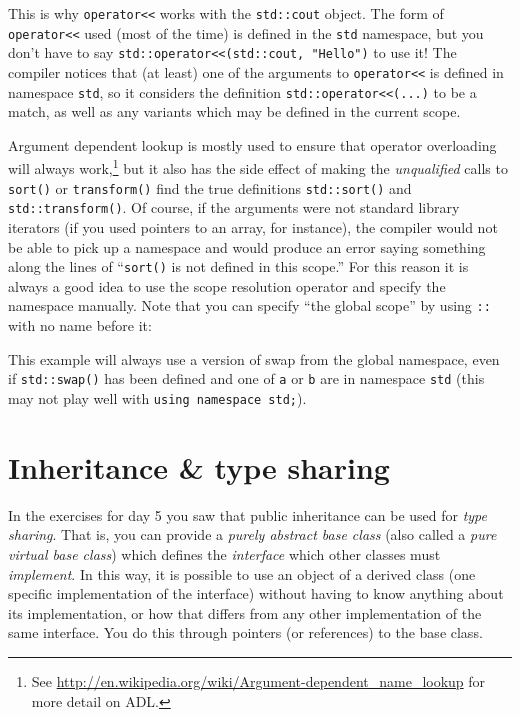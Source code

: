 \documentclass[a4paper]{scrartcl}
\begin{document}
This is why \verb|operator<<| works with the \verb|std::cout| object. The form of \verb|operator<<| used (most of the time) is defined in the \verb|std| namespace, but you don't have to say \verb|std::operator<<(std::cout, "Hello")| to use it! The compiler notices that (at least) one of the arguments to \verb|operator<<| is defined in namespace \verb|std|, so it considers the definition \verb|std::operator<<(...)| to be a match, as well as any variants which may be defined in the current scope.

Argument dependent lookup is mostly used to ensure that operator overloading will always work,\footnote{See \url{http://en.wikipedia.org/wiki/Argument-dependent_name_lookup} for more detail on ADL.} but it also has the side effect of making the \emph{unqualified} calls to \verb|sort()| or \verb|transform()| find the true definitions \verb|std::sort()| and \verb|std::transform()|. Of course, if the arguments were not standard library iterators (if you used pointers to an array, for instance), the compiler would not be able to pick up a namespace and would produce an error saying something along the lines of ``\verb|sort()| is not defined in this scope.'' For this reason it is always a good idea to use the scope resolution operator and specify the namespace manually. Note that you can specify ``the global scope'' by using \verb|::| with no name before it:



This example will always use a version of swap from the global namespace, even if \verb|std::swap()| has been defined and one of \verb|a| or \verb|b| are in namespace \verb|std| (this may not play well with \texttt{using namespace std;}).

\section{Inheritance \& type sharing}\label{sec:inheritance}
In the exercises for day 5 you saw that public inheritance can be used for \emph{type sharing}. That is, you can provide a \emph{purely abstract base class} (also called a \emph{pure virtual base class}) which defines the \emph{interface} which other classes must \emph{implement}. In this way, it is possible to use an object of a derived class (one specific implementation of the interface) without having to know anything about its implementation, or how that differs from any other implementation of the same interface. You do this through pointers (or references) to the base class.
\end{document}
